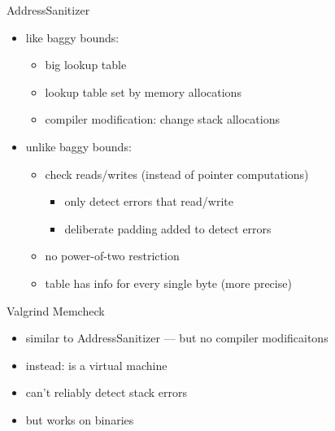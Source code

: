 \begin{frame}{AddressSanitizer}
    \begin{itemize}
    \item like baggy bounds:
        \begin{itemize}
        \item big lookup table
        \item lookup table set by memory allocations
        \item compiler modification: change stack allocations
        \end{itemize}
    \item unlike baggy bounds:
        \begin{itemize}
        \item check reads/writes (instead of pointer computations)
            \begin{itemize}
            \item only detect errors that read/write 
            \item deliberate padding added to detect errors
            \end{itemize}
        \item no power-of-two restriction
        \item table has info for every single byte (more precise)
        \end{itemize}
    \end{itemize}
\end{frame}

\begin{frame}{Valgrind Memcheck}
    \begin{itemize}
    \item similar to AddressSanitizer --- but no compiler modificaitons
    \item instead: is a virtual machine
    \vspace{.5cm}
    \item can't reliably detect stack errors
    \item but works on  binaries
    \end{itemize}
\end{frame}


